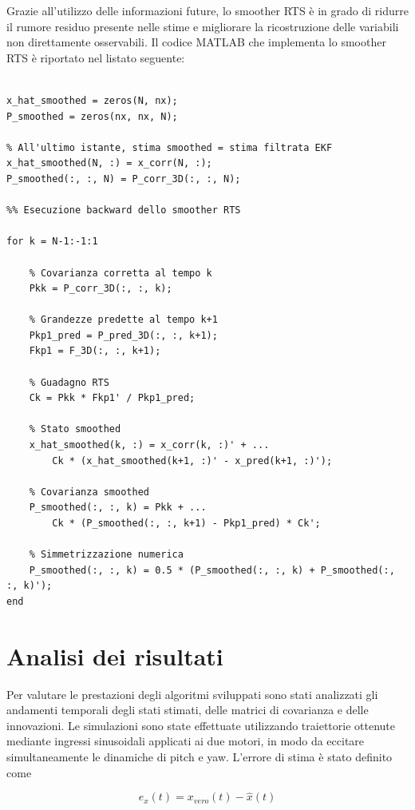 \documentclass[12pt,a4paper]{article}
\begin{document}
Grazie all'utilizzo delle informazioni future, lo smoother RTS è in grado di ridurre
il rumore residuo presente nelle stime e migliorare
la ricostruzione delle variabili non direttamente osservabili.
Il codice MATLAB che implementa lo smoother RTS è riportato nel listato seguente:
\newline
\begin{lstlisting}[style=matlabstyle, caption={Smoother RTS}, label={lst:smoother_rts}]
%% Inizializzazione RTS

x_hat_smoothed = zeros(N, nx);
P_smoothed = zeros(nx, nx, N);

% All'ultimo istante, stima smoothed = stima filtrata EKF
x_hat_smoothed(N, :) = x_corr(N, :);
P_smoothed(:, :, N) = P_corr_3D(:, :, N);

%% Esecuzione backward dello smoother RTS

for k = N-1:-1:1

    % Covarianza corretta al tempo k
    Pkk = P_corr_3D(:, :, k);

    % Grandezze predette al tempo k+1
    Pkp1_pred = P_pred_3D(:, :, k+1);
    Fkp1 = F_3D(:, :, k+1);

    % Guadagno RTS
    Ck = Pkk * Fkp1' / Pkp1_pred;

    % Stato smoothed
    x_hat_smoothed(k, :) = x_corr(k, :)' + ...
        Ck * (x_hat_smoothed(k+1, :)' - x_pred(k+1, :)');

    % Covarianza smoothed
    P_smoothed(:, :, k) = Pkk + ...
        Ck * (P_smoothed(:, :, k+1) - Pkp1_pred) * Ck';

    % Simmetrizzazione numerica
    P_smoothed(:, :, k) = 0.5 * (P_smoothed(:, :, k) + P_smoothed(:, :, k)');
end
\end{lstlisting}

\section{Analisi dei risultati}
Per valutare le prestazioni degli algoritmi sviluppati sono stati analizzati gli andamenti temporali degli stati stimati, delle matrici di covarianza e delle innovazioni.
Le simulazioni sono state effettuate utilizzando traiettorie ottenute mediante ingressi sinusoidali applicati ai due motori, in modo da eccitare simultaneamente le dinamiche di pitch e yaw.
L'errore di stima è stato definito come

\begin{equation}
e_x(t) = x_{vero}(t) - \hat{x}(t)
\end{equation}
\end{document}
